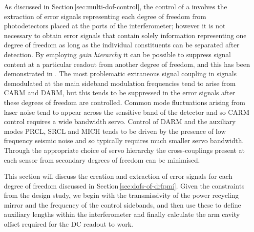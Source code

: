 As discussed in Section\,\ref{sec:multi-dof-control}, the control of a \DRFPMI{} involves the extraction of error signals representing each degree of freedom from photodetectors placed at the ports of the interferometer; however it is not necessary to obtain error signals that contain solely information representing one degree of freedom as long as the individual constituents can be separated after detection. By employing \emph{gain hierarchy} it can be possible to suppress signal content at a particular readout from another degree of freedom, and this has been demonstrated in \LIGO{} \cite{Fritschel2001}. The most problematic extraneous signal coupling in signals demodulated at the main sideband modulation frequencies tend to arise from \gls{CARM} and \gls{DARM}, but this tends to be suppressed in the error signals after these degrees of freedom are controlled. Common mode fluctuations arising from laser noise tend to appear across the sensitive band of the detector and so \gls{CARM} control requires a wide bandwidth servo. Control of \gls{DARM} and the auxiliary modes \gls{PRCL}, \gls{SRCL} and \gls{MICH} tends to be driven by the presence of low frequency seismic noise and so typically requires much smaller servo bandwidth. Through the appropriate choice of servo hierarchy the cross-couplings present at each sensor from secondary degrees of freedom can be minimised.

This section will discuss the creation and extraction of error signals for each degree of freedom discussed in Section\,\ref{sec:dofs-of-drfpmi}. Given the constraints from the design study, we begin with the transmissivity of the power recycling mirror and the frequency of the control sidebands, and then use these to define auxiliary lengths within the interferometer and finally calculate the arm cavity offset required for the \gls{DC} readout to work.

